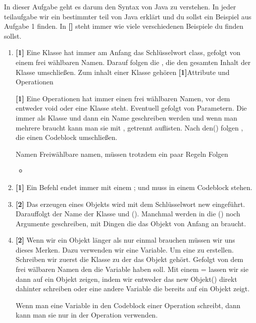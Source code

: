 
In dieser Aufgabe geht es darum den Syntax von Java zu verstehen.
In jeder teilaufgabe wir ein bestimmter teil von Java erklärt und du sollst ein Beispiel aus Aufgabe 1 finden. In \textbf{[]} steht immer wie viele verschiedenen Beispiele du finden sollst.

\renewcommand{\theenumi}{\alph{enumi}}
\begin{enumerate}
    \item \textbf{[1]} Eine Klasse hat immer am Anfang das Schlüsselwort class, gefolgt von einem frei wählbaren Namen. Darauf folgen die { }, die den gesamten Inhalt der Klasse umschließen.
    Zum inhalt einer Klasse gehören \textbf{[1]}Attribute und Operationen

    \textbf{[1]} Eine Operationen hat immer einen frei wählbaren Namen, vor dem entweder void oder eine Klasse steht. Eventuell gefolgt von Parametern. Die immer als Klasse und dann ein Name geschreiben werden und wenn man mehrere braucht kann man sie mit , getrennt auflisten.
    Nach den() folgen {}, die einen Codeblock umschließen.
    \begin{Infobox}{Namen}
        Freiwählbare namen, müssen trotzdem ein paar Regeln Folgen
        \begin{itemize}
            \item 
        \end{itemize}
    \end{Infobox}
    \item \textbf{[1]} Ein Befehl endet immer mit einem ; und muss in einem Codeblock stehen.
    \item \textbf{[2]} Das erzeugen eines Objekts wird mit dem Schlüsselwort new eingeführt. Darauffolgt der Name der Klasse und (). Manchmal werden in die () noch Argumente geschreiben, mit Dingen die das Objekt von Anfang an braucht.
    \item \textbf{[2]} Wenn wir ein Objekt länger als nur einmal brauchen müssen wir uns dieses Merken. Dazu verwenden wir eine Variable. Um eine zu erstellen. Schreiben wir zuerst die Klasse zu der das Objekt gehört. Gefolgt von dem frei wälbaren Namen den die Variable haben soll. Mit einem = lassen wir sie dann auf ein Objekt zeigen, indem wir entweder das new Objekt() direkt dahinter schreiben oder eine andere 
    Variable die bereits auf ein Objekt zeigt.
    \begin{Infobox}[Attribute]
        Wenn man eine Variable in den Codeblock einer Operation schreibt, dann kann man sie nur in der Operation verwenden.

\end{Infobox}
\end{enumerate}
